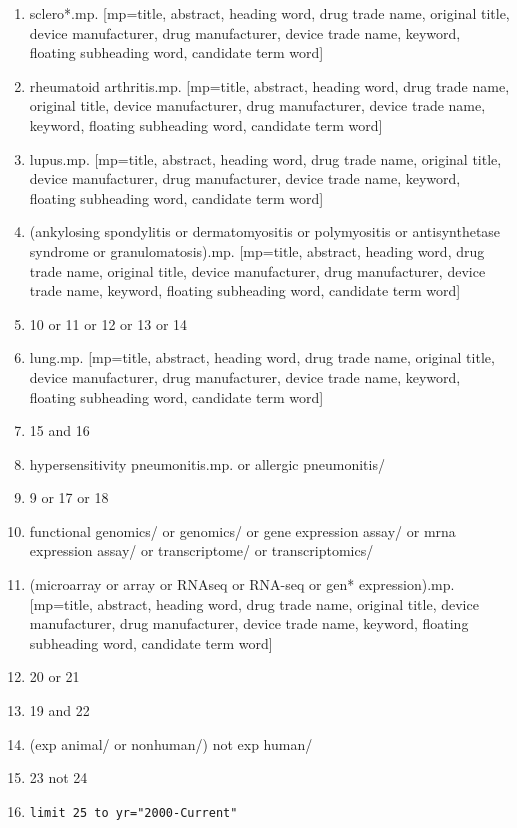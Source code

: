 \documentclass[
]{article}
\begin{document}
\begin{enumerate}
\item
  sclero*.mp. {[}mp=title, abstract, heading word, drug trade name, original title, device manufacturer, drug manufacturer, device trade name, keyword, floating subheading word, candidate term word{]}
\item
  rheumatoid arthritis.mp. {[}mp=title, abstract, heading word, drug trade name, original title, device manufacturer, drug manufacturer, device trade name, keyword, floating subheading word, candidate term word{]}
\item
  lupus.mp. {[}mp=title, abstract, heading word, drug trade name, original title, device manufacturer, drug manufacturer, device trade name, keyword, floating subheading word, candidate term word{]}
\item
  (ankylosing spondylitis or dermatomyositis or polymyositis or antisynthetase syndrome or granulomatosis).mp. {[}mp=title, abstract, heading word, drug trade name, original title, device manufacturer, drug manufacturer, device trade name, keyword, floating subheading word, candidate term word{]}
\item
  10 or 11 or 12 or 13 or 14
\item
  lung.mp. {[}mp=title, abstract, heading word, drug trade name, original title, device manufacturer, drug manufacturer, device trade name, keyword, floating subheading word, candidate term word{]}
\item
  15 and 16
\item
  hypersensitivity pneumonitis.mp. or allergic pneumonitis/
\item
  9 or 17 or 18
\item
  functional genomics/ or genomics/ or gene expression assay/ or mrna expression assay/ or transcriptome/ or transcriptomics/
\item
  (microarray or array or RNAseq or RNA-seq or gen* expression).mp. {[}mp=title, abstract, heading word, drug trade name, original title, device manufacturer, drug manufacturer, device trade name, keyword, floating subheading word, candidate term word{]}
\item
  20 or 21
\item
  19 and 22
\item
  (exp animal/ or nonhuman/) not exp human/
\item
  23 not 24
\item
\begin{verbatim}
limit 25 to yr="2000-Current"
\end{verbatim}
\end{enumerate}
\end{document}
